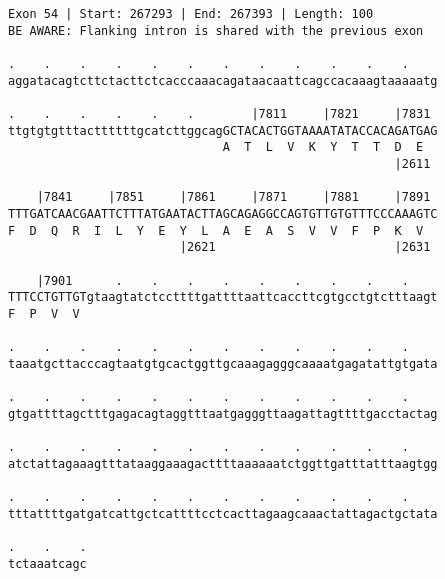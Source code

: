 \documentclass{article}
\begin{document}
\begin{Verbatim}
Exon 54 | Start: 267293 | End: 267393 | Length: 100
BE AWARE: Flanking intron is shared with the previous exon
 
.    .    .    .    .    .    .    .    .    .    .    .    
aggatacagtcttctacttctcacccaaacagataacaattcagccacaaagtaaaaatg
  
.    .    .    .    .    .        |7811     |7821     |7831 
ttgtgtgtttacttttttgcatcttggcagGCTACACTGGTAAAATATACCACAGATGAG
                              A  T  L  V  K  Y  T  T  D  E  
                                                      |2611 
  
    |7841     |7851     |7861     |7871     |7881     |7891 
TTTGATCAACGAATTCTTTATGAATACTTAGCAGAGGCCAGTGTTGTGTTTCCCAAAGTC
F  D  Q  R  I  L  Y  E  Y  L  A  E  A  S  V  V  F  P  K  V  
                        |2621                         |2631 
  
    |7901      .    .    .    .    .    .    .    .    .    
TTTCCTGTTGTgtaagtatctccttttgattttaattcaccttcgtgcctgtctttaagt
F  P  V  V                                                  
  
.    .    .    .    .    .    .    .    .    .    .    .    
taaatgcttacccagtaatgtgcactggttgcaaagagggcaaaatgagatattgtgata
  
.    .    .    .    .    .    .    .    .    .    .    .    
gtgattttagctttgagacagtaggtttaatgagggttaagattagttttgacctactag
  
.    .    .    .    .    .    .    .    .    .    .    .    
atctattagaaagtttataaggaaagacttttaaaaaatctggttgatttatttaagtgg
  
.    .    .    .    .    .    .    .    .    .    .    .    
tttattttgatgatcattgctcattttcctcacttagaagcaaactattagactgctata
  
.    .    .
tctaaatcagc
\end{Verbatim}
\newpage
\end{document}

